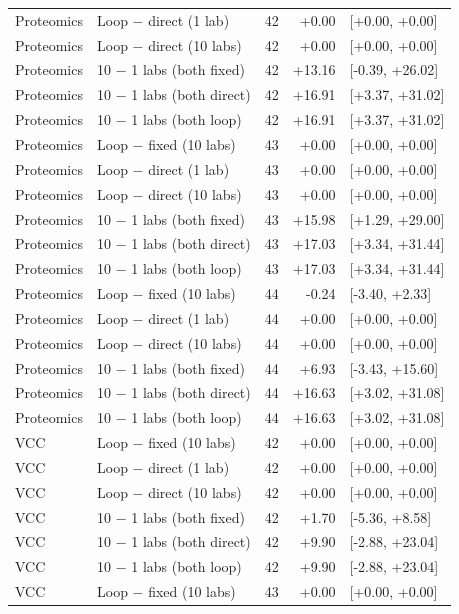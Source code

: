 \begin{longtable}{llrrl}
Proteomics & Loop $-$ direct (1 lab) & 42 & +0.00 & [+0.00, +0.00] \\
Proteomics & Loop $-$ direct (10 labs) & 42 & +0.00 & [+0.00, +0.00] \\
Proteomics & 10 $-$ 1 labs (both fixed) & 42 & +13.16 & [-0.39, +26.02] \\
Proteomics & 10 $-$ 1 labs (both direct) & 42 & +16.91 & [+3.37, +31.02] \\
Proteomics & 10 $-$ 1 labs (both loop) & 42 & +16.91 & [+3.37, +31.02] \\
\midrule
Proteomics & Loop $-$ fixed (10 labs) & 43 & +0.00 & [+0.00, +0.00] \\
Proteomics & Loop $-$ direct (1 lab) & 43 & +0.00 & [+0.00, +0.00] \\
Proteomics & Loop $-$ direct (10 labs) & 43 & +0.00 & [+0.00, +0.00] \\
Proteomics & 10 $-$ 1 labs (both fixed) & 43 & +15.98 & [+1.29, +29.00] \\
Proteomics & 10 $-$ 1 labs (both direct) & 43 & +17.03 & [+3.34, +31.44] \\
Proteomics & 10 $-$ 1 labs (both loop) & 43 & +17.03 & [+3.34, +31.44] \\
\midrule
Proteomics & Loop $-$ fixed (10 labs) & 44 & -0.24 & [-3.40, +2.33] \\
Proteomics & Loop $-$ direct (1 lab) & 44 & +0.00 & [+0.00, +0.00] \\
Proteomics & Loop $-$ direct (10 labs) & 44 & +0.00 & [+0.00, +0.00] \\
Proteomics & 10 $-$ 1 labs (both fixed) & 44 & +6.93 & [-3.43, +15.60] \\
Proteomics & 10 $-$ 1 labs (both direct) & 44 & +16.63 & [+3.02, +31.08] \\
Proteomics & 10 $-$ 1 labs (both loop) & 44 & +16.63 & [+3.02, +31.08] \\
\midrule
VCC & Loop $-$ fixed (10 labs) & 42 & +0.00 & [+0.00, +0.00] \\
VCC & Loop $-$ direct (1 lab) & 42 & +0.00 & [+0.00, +0.00] \\
VCC & Loop $-$ direct (10 labs) & 42 & +0.00 & [+0.00, +0.00] \\
VCC & 10 $-$ 1 labs (both fixed) & 42 & +1.70 & [-5.36, +8.58] \\
VCC & 10 $-$ 1 labs (both direct) & 42 & +9.90 & [-2.88, +23.04] \\
VCC & 10 $-$ 1 labs (both loop) & 42 & +9.90 & [-2.88, +23.04] \\
\midrule
VCC & Loop $-$ fixed (10 labs) & 43 & +0.00 & [+0.00, +0.00] \\

\end{longtable}
